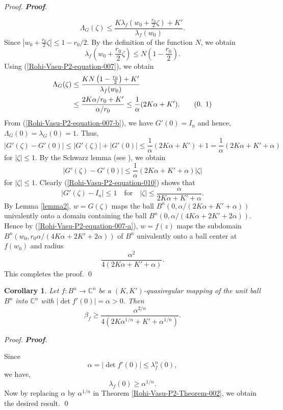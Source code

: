 \documentclass[a4paper,12pt,reqno]{amsart}
\theoremstyle{plain}
\newtheorem{cor}{Corollary}
\newcommand\numberthis{\addtocounter{equation}{1}\tag{\theequation}}
\theoremstyle{definition}
\newenvironment{pf}[1][]{%
	\vskip 3mm
	\noindent
	\ifthenelse{\equal{#1}{}}%
	{{\slshape Proof. }}%
	{{\slshape #1.} }%
}%
{\qed\bigskip}
\newcommand{\IC}{{\mathbb C}}
\renewcommand{\theequation}{\thesection.
\arabic{equation}}
\numberwithin{equation}{section}
\begin{document}
\begin{pf}[{\bf Proof}]
$$\Lambda_G(\zeta)\leq \frac{K\lambda_f(w_0+\frac{r_0}{2}\zeta)+K'}{\lambda_f(w_0)}.$$
Since $|w_0+\frac{r_0}{2}\zeta|\leq 1-r_0/2.$ By the definition of the function $N$, we obtain
$$\lambda_f(w_0+\frac{r_0}{2}\zeta)\leq N\left(1-\frac{r_0}{2}\right).$$
Using (\ref{Rohi-Vasu-P2-equation-007}), we obtain
\begin{align*}\label{Rohi-Vasu-P2-equation-008}
\Lambda_G(\zeta)&\leq \frac{KN\left(1-\frac{r_0}{2}\right)+K'}{\lambda_f(w_0)}\\
&\leq \frac{2K\alpha/r_0+K'}{\alpha/r_0}\leq \frac{1}{\alpha}(2K\alpha+K'). \numberthis
\end{align*}
From (\ref{Rohi-Vasu-P2-equation-007-b}), we  have $G'(0)=I_n$ and hence, $\Lambda_G(0)=\lambda_G(0)=1.$ Thus,
\begin{equation}\label{Rohi-Vasu-P2-equation-009}
|G'(\zeta)-G'(0)|\leq |G'(\zeta)|+|G'(0)|\leq \frac{1}{\alpha}(2K\alpha+K')+1=\frac{1}{\alpha}\left(2K\alpha+K'+\alpha\right)
\end{equation}
for $|\zeta|\leq 1.$
By the Schwarz lemma (see \cite{Bochner-Martin-1948}), we obtain 
\begin{equation}\label{Rohi-Vasu-P2-equation-010}
|G'(\zeta)-G'(0)|\leq \frac{1}{\alpha}\left(2K\alpha+K'+\alpha\right)|\zeta|
\end{equation} 
for $|\zeta|\leq 1.$
Clearly (\ref{Rohi-Vasu-P2-equation-010}) shows that
\begin{equation*}
|G'(\zeta)-I_n|\leq 1 \quad \text{for} \quad |\zeta|\leq \frac{\alpha}{2K\alpha+K'+\alpha}.
\end{equation*}
By Lemma \ref{lemma2}, $w=G(\zeta)$ maps the ball $B^n\left(0,\alpha/(2K\alpha+K'+\alpha)\right)$ univalently onto a domain containing the ball $B^n\left(0,\alpha/(4K\alpha+2K'+2\alpha)\right).$ Hence by (\ref{Rohi-Vasu-P2-equation-007-a}), $w=f(z)$ maps the subdomain $B^n \left(w_0, r_0\alpha/(4K\alpha+2K'+2\alpha)\right)$ of $B^n$ univalently onto a ball center at $f(w_0)$ and radius 
$$\frac{\alpha^2}{4(2K\alpha+K'+\alpha)}.$$
This completes the proof.
\end{pf}

\begin{cor}
Let $f:B^n\to \IC^n$ be a $(K,K')$-quasiregular mapping of the unit ball $B^n$ into $\IC^n$ with $|\operatorname{det} f'(0)|=\alpha>0$. Then
$$\beta_f\geq \frac{\alpha^{2/n}}{4(2K\alpha^{1/n}+K'+\alpha^{1/n})}.$$ 
\end{cor}
\begin{pf}[{\bf Proof}]
Since $$\alpha=|\operatorname{det} f'(0)|\leq \lambda_f^n(0),$$
we have,
     $$\lambda_f(0)\geq\alpha^{1/n}.$$
Now by replacing $\alpha$ by $\alpha^{1/n}$ in Theorem \ref{Rohi-Vasu-P2-Theorem-002}, we obtain the desired result.
\end{pf}
\end{document}
